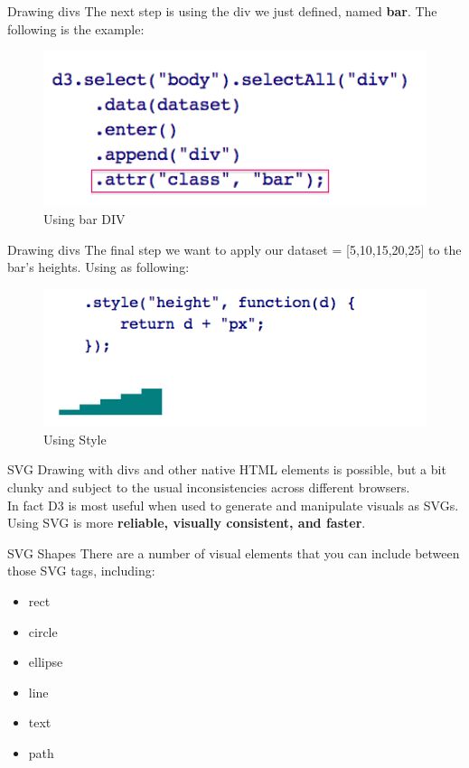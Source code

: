 \documentclass{beamer}
\begin{document}
\begin{frame}{Drawing divs}
The next step is using the div we just defined, named \textbf{bar}. The following is the example:
\begin{figure}
\centering
\includegraphics[width=1.0\textwidth]{./images/BAR.png}
\caption{\label{fig:bar} Using bar DIV}
\end{figure}
\end{frame}

\begin{frame}{Drawing divs}
The final step we want to apply our dataset = [5,10,15,20,25] to the bar's heights. Using as following:
\begin{figure}
\centering
\includegraphics[width=1.0\textwidth]{./images/style.png}
\caption{\label{fig:style} Using Style}
\end{figure}
\end{frame}

\begin{frame}{SVG} 
Drawing with divs and other native HTML elements is possible, but a bit clunky and subject to the usual inconsistencies across different browsers. \\
In fact D3 is most useful when used to generate and manipulate visuals as SVGs. Using SVG is more \textbf{reliable, visually consistent, and faster}.
\end{frame} 

\begin{frame}{SVG Shapes} 
There are a number of visual elements that you can include between those SVG tags, including:
\begin{itemize}
	\item rect 
	\item circle
	\item ellipse 
	\item line
	\item text
	\item path
\end{itemize}
\end{frame}
\end{document}
